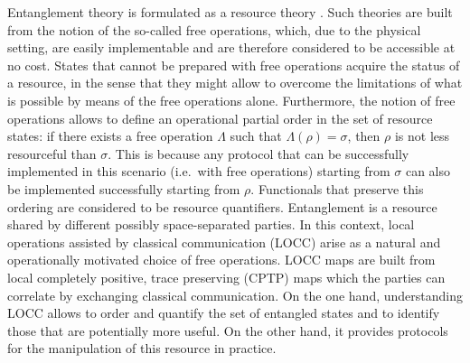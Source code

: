 \documentclass[superscriptaddress,twocolumn]{revtex4}\usepackage[utf8]{inputenc}
\begin{document}
Entanglement theory is formulated as a resource theory \cite{resource}. Such theories are built from the notion of the so-called free operations, which, due to the physical setting, are easily implementable and are therefore considered to be accessible at no cost. States that cannot be prepared with free operations acquire the status of a resource, in the sense that they might allow to overcome the limitations of what is possible by means of the free operations alone. Furthermore, the notion of free operations allows to define an operational partial order in the set of resource states: if there exists a free operation $\Lambda$ such that $\Lambda(\rho)=\sigma$, then $\rho$ is not less resourceful than $\sigma$. This is because any protocol that can be successfully implemented in this scenario (i.e.\ with free operations) starting from $\sigma$ can also be implemented successfully starting from $\rho$.  Functionals that preserve this ordering are considered to be resource quantifiers. Entanglement is a resource shared by different possibly space-separated parties. In this context, local operations assisted by  classical communication (LOCC) arise as a natural and operationally motivated choice of free operations. LOCC maps are built from local completely positive, trace preserving (CPTP) maps which the parties can correlate by exchanging classical communication. On the one hand, understanding LOCC allows to order and quantify the set of entangled states and to identify those that are potentially more useful. On the other hand, it provides protocols for the manipulation of this resource in practice.
\end{document}
